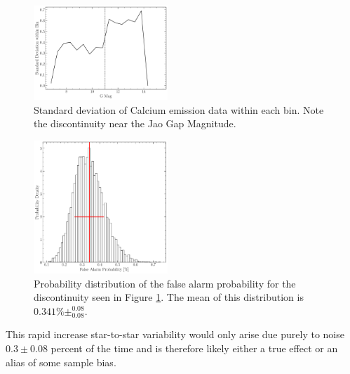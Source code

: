 \begin{figure}
  \centering
  \includegraphics[width=0.45\textwidth]{figures/Deviation.pdf}
  \caption{Standard deviation of Calcium emission data within each bin. Note
  the discontinuity near the Jao Gap Magnitude.}
  \label{fig:deviation}
\end{figure}

\begin{figure}
  \centering
  \includegraphics[width=0.45\textwidth]{figures/fpDist.pdf}
  \caption{Probability distribution of the false alarm probability for the
  discontinuity seen in Figure \ref{fig:deviation}. The mean of this
  distribution is $0.341\%\pm^{0.08}_{0.08}$.}
  \label{fig:dist}
\end{figure}

This rapid increase star-to-star variability would only arise due purely to
noise $0.3\pm0.08$ percent of the time and is therefore likely either a true
effect or an alias of some sample bias.

